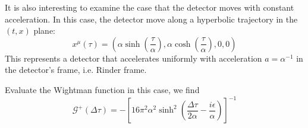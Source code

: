 \documentclass[12pt]{article}
\numberwithin{equation}{section}
\theoremstyle{1style}
\begin{document}
\bigskip

It is also interesting to examine the case that the detector moves with constant acceleration.
In this case, the detector move along a hyperbolic trajectory in the \((t,x)\) plane:
\begin{equation}
  x^{\mu}(\tau)=\left(\alpha\sinh(\frac{\tau}{\alpha}),\alpha \cosh(\frac{\tau}{\alpha}),0,0 \right)
\end{equation}
This represents a detector that accelerates uniformly with acceleration \(a=\alpha^{-1}\) in the detector's frame, i.e. Rinder frame.


Evaluate the Wightman function in this case, we find
\begin{equation}\label{2325}
  \mathcal{G}^+(\Delta\tau)=-\left[16\pi^2\alpha^2\sinh^2\left(\frac{\Delta\tau}{2\alpha}-\frac{i\epsilon}{\alpha}\right)\right]^{-1}
\end{equation}
\end{document}
